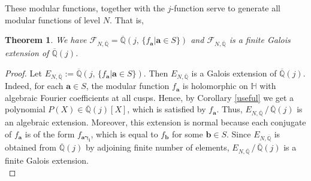 \documentclass[11pt, reqno]{amsart}
\newtheorem{theorem}{Theorem}[section]
\begin{document}
These modular functions, together with the $j$-function serve to generate all modular functions of level $N$. That is,
\begin{theorem}\label{mdft..}
We have $\mathcal{F}_{N,\overline{\mathbb{Q}}}=\overline{\mathbb{Q}}\left( j, \, \{ f_{\boldsymbol{a}} |{\boldsymbol{a}}\in S\} \right)$ and $\mathcal{F}_{N,\overline{\mathbb{Q}}}$ is a finite Galois extension of $\overline{\mathbb{Q}}(j)$.
\end{theorem}
\begin{proof}

Let $E_{N,\overline{\mathbb{Q}}}:= \overline{\mathbb{Q}}\left(j, \, \{ f_{\boldsymbol{a}} | {\boldsymbol{a}}\in S\}\right)$. Then $E_{N, \overline{\mathbb{Q}}}$ is a Galois extension of $\overline{\mathbb{Q}}(j)$. Indeed, for each ${\boldsymbol{a}}\in S$, the modular function $f_{\boldsymbol{a}}$ is holomorphic on $\mathbb{H}$ with algebraic Fourier coefficients at all cusps. Hence, by Corollary \ref{useful} we get a polynomial $P(X)\in\overline{\mathbb{Q}}(j)[X]$, which is satisfied by $f_{\boldsymbol{a}}$. Thus, $E_{N,\overline{\mathbb{Q}}} \, / \, \overline{\mathbb{Q}}(j)$ is an algebraic extension. Moreover, this extension is normal because each conjugate of $f_{\boldsymbol{a}}$ is of the form $f_{\boldsymbol{a\gamma_i}}$, which is equal to $f_{\boldsymbol{b}}$ for some $\boldsymbol{b}\in S$. Since $E_{N,\overline{\mathbb{Q}}}$ is obtained from $\overline{\mathbb{Q}}(j)$ by adjoining finite number of elements, $E_{N,\overline{\mathbb{Q}}} \, / \, \overline{\mathbb{Q}}(j)$ is a finite Galois extension.\\


\end{proof}
\end{document}
